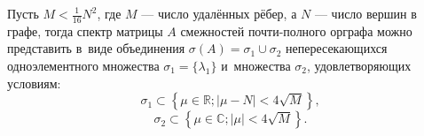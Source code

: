     Пусть \( M < \frac{1}{16} N^2 \),
    где \( M \) --- число удалённых рёбер, а \( N \) --- число вершин в графе,
    тогда спектр матрицы \( A \) смежностей почти-полного орграфа можно представить в~виде
    объединения \( \sigma\left(A\right) = \sigma_1 \cup \sigma_2 \)
    непересекающихся
    одноэлементного множества \( \sigma_1=\{\lambda_1\} \)
    и~множества \( \sigma_2 \), удовлетворяющих условиям:
    \[ \sigma_1 \subset \left\{ \mu\in\mathbb{R}; \lvert \mu - N \rvert < 4\sqrt{M} \right\}, \]
    \[ \sigma_2 \subset \left\{ \mu\in\mathbb{C}; \lvert \mu \rvert < 4\sqrt{M} \right\}. \]